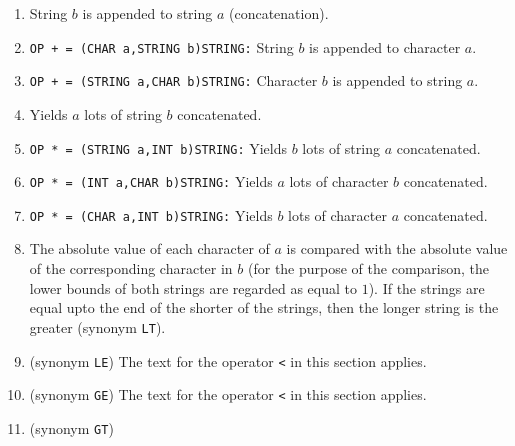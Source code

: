 \begin{enumerate}
\item {}
\newline
String $b$ is appended to string $a$ (concatenation).
\item \verb|OP + = (CHAR a,STRING b)STRING:| \newline
String $b$ is appended to character $a$.
\item \verb|OP + = (STRING a,CHAR b)STRING:| \newline
Character $b$ is appended to string $a$.
\item {}\newline
Yields $a$ lots of string $b$ concatenated.
\item \verb|OP * = (STRING a,INT b)STRING:| \newline
Yields $b$ lots of string $a$ concatenated.
\item \verb|OP * = (INT a,CHAR b)STRING:| \newline
Yields $a$ lots of character $b$ concatenated.
\item \verb|OP * = (CHAR a,INT b)STRING:| \newline
Yields $b$ lots of character $a$ concatenated.
\item {}\newline
The absolute value of each character of $a$ is compared with the
absolute value of the corresponding character in $b$ (for the purpose
of the comparison, the lower bounds of both strings are regarded as
equal to $1$). If the strings are equal upto the end of the shorter of
the strings, then the longer string is the greater
(synonym \verb|LT|).
\item {}\newline
(synonym \verb|LE|)\newline
The text for the operator \verb|<| in this section applies.
\item {}\newline
(synonym \verb|GE|)\newline
The text for the operator \verb|<| in this section applies.
\item {}
\newline (synonym \verb|GT|)\newline

\end{enumerate}
